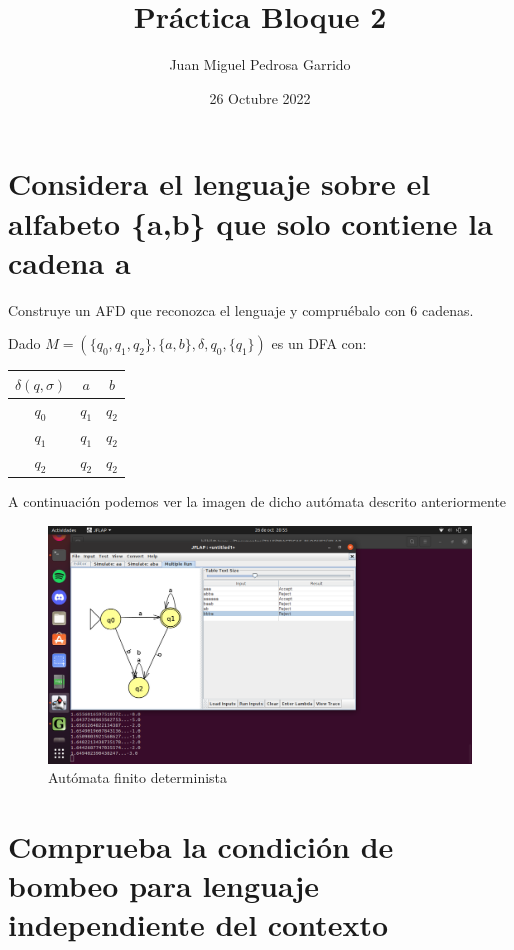 \documentclass[11pt]{article}
\title{\textbf{Práctica Bloque 2}}
\author{Juan Miguel Pedrosa Garrido}
\date{26 Octubre 2022}
\begin{document}
\maketitle
\thispagestyle{empty}

\section{Considera el lenguaje sobre el alfabeto \{a,b\} que solo contiene la cadena a}
Construye un AFD que reconozca el lenguaje y compruébalo con 6 cadenas.

Dado $M=(\{q_0,q_1,q_2\}, \{a,b\}, \delta, q_0, \{q_1\})$ es un DFA con:\\

\begin{table}[h!]
\begin{tabular}{c|c|c}
  $\delta(q,\sigma)$ & $a$ & $b$\\
  \hline
  $q_0$& $q_1$ & $q_2$\\
  \hline
  $q_1$& $q_1$ & $q_2$\\
  \hline
  $q_2$& $q_2$ & $q_2$
\end{tabular}
\end{table}
A continuación podemos ver la imagen de dicho autómata descrito anteriormente
\begin{figure}[htb]
	\centering
	\includegraphics[width=1.25\textwidth]{1.png}
	\caption{Autómata finito determinista}
\end{figure}

\section{Comprueba la condición de bombeo para lenguaje independiente del contexto}
\end{document}
